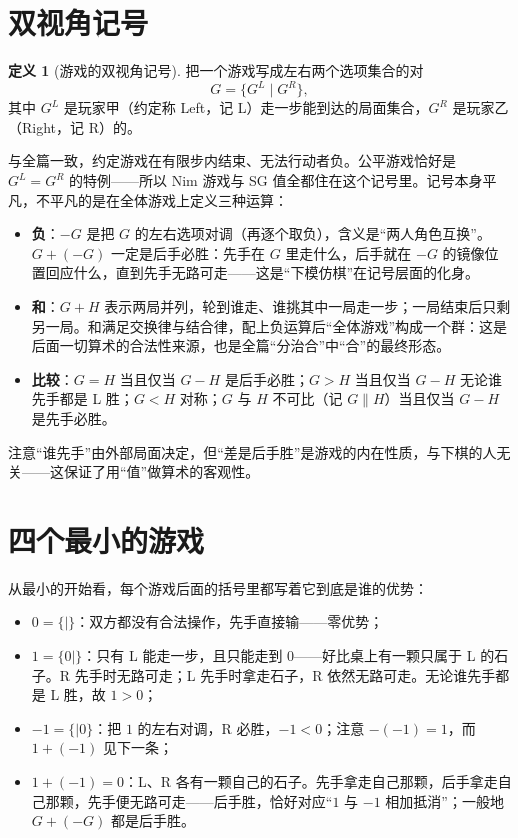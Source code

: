 \documentclass[UTF8,a4paper,11pt,oneside,openany,fontset=fandol]{ctexbook}
\theoremstyle{definition}
\newtheorem{definition}{定义}[chapter]
\begin{document}
\section{双视角记号}
\begin{definition}[游戏的双视角记号]
把一个游戏写成左右两个选项集合的对
\[
 G=\{G^L\mid G^R\},
\]
其中 $G^L$ 是玩家甲（约定称 Left，记 L）走一步能到达的局面集合，$G^R$ 是玩家乙（Right，记 R）的。
\end{definition}
与全篇一致，约定游戏在有限步内结束、无法行动者负。公平游戏恰好是 $G^L=G^R$ 的特例——所以 Nim 游戏与 SG 值全都住在这个记号里。记号本身平凡，不平凡的是在全体游戏上定义三种运算：
\begin{itemize}
\item \textbf{负}：$-G$ 是把 $G$ 的左右选项对调（再逐个取负），含义是“两人角色互换”。$G+(-G)$ 一定是后手必胜：先手在 $G$ 里走什么，后手就在 $-G$ 的镜像位置回应什么，直到先手无路可走——这是“下模仿棋”在记号层面的化身。
\item \textbf{和}：$G+H$ 表示两局并列，轮到谁走、谁挑其中一局走一步；一局结束后只剩另一局。和满足交换律与结合律，配上负运算后“全体游戏”构成一个群：这是后面一切算术的合法性来源，也是全篇“分治合”中“合”的最终形态。
\item \textbf{比较}：$G=H$ 当且仅当 $G-H$ 是后手必胜；$G>H$ 当且仅当 $G-H$ 无论谁先手都是 L 胜；$G<H$ 对称；$G$ 与 $H$ 不可比（记 $G\parallel H$）当且仅当 $G-H$ 是先手必胜。
\end{itemize}
注意“谁先手”由外部局面决定，但“差是后手胜”是游戏的内在性质，与下棋的人无关——这保证了用“值”做算术的客观性。

\section{四个最小的游戏}
从最小的开始看，每个游戏后面的括号里都写着它到底是谁的优势：
\begin{itemize}
\item $0=\{\mid\}$：双方都没有合法操作，先手直接输——零优势；
\item $1=\{0\mid\}$：只有 L 能走一步，且只能走到 $0$——好比桌上有一颗只属于 L 的石子。R 先手时无路可走；L 先手时拿走石子，R 依然无路可走。无论谁先手都是 L 胜，故 $1>0$；
\item $-1=\{\mid 0\}$：把 $1$ 的左右对调，R 必胜，$-1<0$；注意 $-(-1)=1$，而 $1+(-1)$ 见下一条；
\item $1+(-1)=0$：L、R 各有一颗自己的石子。先手拿走自己那颗，后手拿走自己那颗，先手便无路可走——后手胜，恰好对应“$1$ 与 $-1$ 相加抵消”；一般地 $G+(-G)$ 都是后手胜。
\end{itemize}
\end{document}
